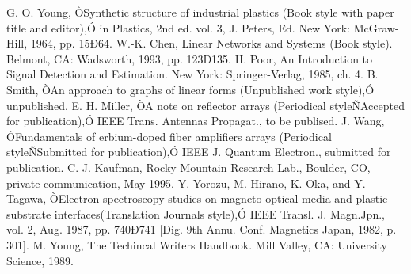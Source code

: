 \documentclass[letterpaper, 10 pt, conference]{ieeeconf}  %
\begin{document}
\begin{thebibliography}{99}



 G. O. Young, ÒSynthetic structure of industrial plastics (Book style with paper title and editor),Ó 	in Plastics, 2nd ed. vol. 3, J. Peters, Ed.  New York: McGraw-Hill, 1964, pp. 15Ð64.
 W.-K. Chen, Linear Networks and Systems (Book style).	Belmont, CA: Wadsworth, 1993, pp. 123Ð135.
 H. Poor, An Introduction to Signal Detection and Estimation.   New York: Springer-Verlag, 1985, ch. 4.
 B. Smith, ÒAn approach to graphs of linear forms (Unpublished work style),Ó unpublished.
 E. H. Miller, ÒA note on reflector arrays (Periodical styleÑAccepted for publication),Ó IEEE Trans. Antennas Propagat., to be publised.
 J. Wang, ÒFundamentals of erbium-doped fiber amplifiers arrays (Periodical styleÑSubmitted for publication),Ó IEEE J. Quantum Electron., submitted for publication.
 C. J. Kaufman, Rocky Mountain Research Lab., Boulder, CO, private communication, May 1995.
 Y. Yorozu, M. Hirano, K. Oka, and Y. Tagawa, ÒElectron spectroscopy studies on magneto-optical media and plastic substrate interfaces(Translation Journals style),Ó IEEE Transl. J. Magn.Jpn., vol. 2, Aug. 1987, pp. 740Ð741 [Dig. 9th Annu. Conf. Magnetics Japan, 1982, p. 301].
 M. Young, The Techincal Writers Handbook.  Mill Valley, CA: University Science, 1989.


\end{thebibliography}
\end{document}
